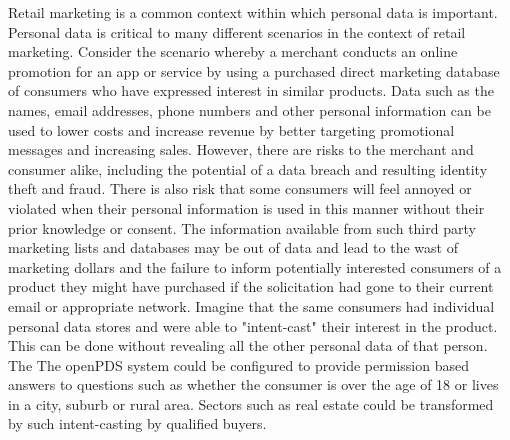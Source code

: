 Retail marketing is a common context within which personal data is important.
Personal data is critical to many different scenarios in the context of retail marketing.  
Consider the scenario whereby a merchant conducts an online promotion for an app or service by using a purchased direct marketing database of consumers who have expressed interest in similar products.
Data such as the names, email addresses, phone numbers and other personal information can be used to lower costs and increase revenue by better targeting promotional messages and increasing sales.
However, there are risks to the merchant and consumer alike, including the potential of a data breach and resulting identity theft and fraud.
There is also risk that some consumers will feel annoyed or violated when their personal information is used in this manner without their prior knowledge or consent.
The information available from such third party marketing lists and databases may be out of data and lead to the wast of marketing dollars and the failure to inform potentially interested consumers of a product they might have purchased if the solicitation had gone to their current email or appropriate network.
Imagine that the same consumers had individual personal data stores and were able to "intent-cast" their interest in the product. 
This can be done without revealing all the other personal data of that person.
The  The openPDS system could be configured to provide permission based answers to questions such as whether the consumer is over the age of 18 or lives in a city, suburb or rural area.
Sectors such as real estate could be transformed by such intent-casting by qualified buyers.   

